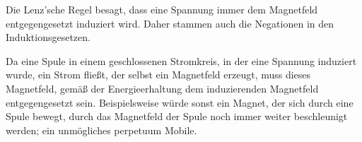 Die Lenz'sche Regel besagt, dass eine Spannung immer dem Magnetfeld entgegengesetzt induziert wird. Daher stammen auch die Negationen in den Induktionsgesetzen.

Da eine Spule in einem geschlossenen Stromkreis, in der eine Spannung induziert wurde, ein Strom fließt, der selbst ein Magnetfeld erzeugt, muss dieses Magnetfeld, gemäß der Energieerhaltung dem induzierenden Magnetfeld entgegengesetzt sein. Beispielsweise würde sonst ein Magnet, der sich durch eine Spule bewegt, durch das Magnetfeld der Spule noch immer weiter beschleunigt werden; ein unmögliches perpetuum Mobile.